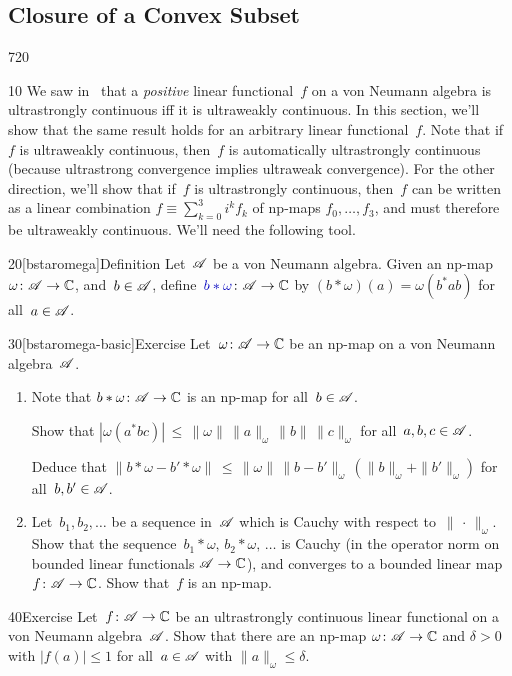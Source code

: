 \subsection{Closure of a Convex Subset}
\begin{parsec}{720}%
\begin{point}{10}%
We saw in~
that a \emph{positive} linear functional~$f$
on a von Neumann algebra 
is ultrastrongly continuous iff it is ultraweakly continuous.
In this section, we'll show that the same result holds
for an arbitrary linear functional~$f$.
Note that if~$f$ is ultraweakly continuous,
then~$f$ is automatically ultrastrongly continuous
(because ultrastrong convergence implies ultraweak convergence).
For the other direction,
we'll show that if~$f$ is ultrastrongly continuous,
then~$f$ can be written as a linear combination
$f\equiv \sum_{k=0}^3 i^k f_k$
of np-maps $f_0,\dotsc,f_3$,
and must therefore be ultraweakly continuous.
We'll need the following tool.
\end{point}
\begin{point}{20}[bstaromega]{Definition}%
Let~$\mathscr{A}$ be a von Neumann algebra.
Given an np-map $\omega\colon \mathscr{A}\to\mathbb{C}$,
and~$b\in \mathscr{A}$,
define~$\Define{b*\omega}\colon \scrA\to \C$%
	by
$(b*\omega)(a)=\omega(b^*ab)$ for all~$a\in \mathscr{A}$.
\end{point}
\begin{point}{30}[bstaromega-basic]{Exercise}%
Let~$\omega\colon \mathscr{A}\to \mathbb{C}$ be an np-map on a von Neumann algebra~$\mathscr{A}$.
\begin{enumerate}
\item
Note that $b*\omega\colon \mathscr{A}\to\mathbb{C}$
is an np-map for all~$b\in \mathscr{A}$.

Show that $\left|\omega(a^*bc)\right| 
\,\leq\, \|\omega\|\,\|a\|_\omega\, \|b\|\, \|c\|_\omega$
for all~$a,b,c\in\mathscr{A}$.

Deduce that $\| b*\omega - b'*\omega\|
\,\leq\, \|\omega\| \,\|b-b'\|_\omega\, (\|b\|_\omega + \|b'\|_\omega)$
for all~$b,b'\in\mathscr{A}$.

\item
Let~$b_1,b_2,\dotsc$ be a sequence in~$\mathscr{A}$
which is Cauchy with respect to~$\|\,\cdot\,\|_\omega$.
Show that the sequence~$b_1*\omega,\,b_2*\omega,\,\dotsc$ 
is Cauchy (in the operator norm
on bounded linear functionals $\mathscr{A}\to\mathbb{C}$),
and converges to a bounded linear map~$f\colon \mathscr{A}\to\mathbb{C}$.
Show that~$f$ is an np-map.
\end{enumerate}
\spacingfix%
\end{point}%
\begin{point}{40}{Exercise}%
Let~$f\colon \mathscr{A}\to \mathbb{C}$ be an ultrastrongly continuous linear
functional on a von Neumann algebra~$\mathscr{A}$.
Show that there are an np-map
$\omega\colon \mathscr{A}\to \mathbb{C}$
and $\delta>0$
with $\left|f(a)\right|\leq 1$
for all~$a\in\mathscr{A}$ with $\|a\|_\omega \leq \delta$.


\end{point}
\end{parsec}
